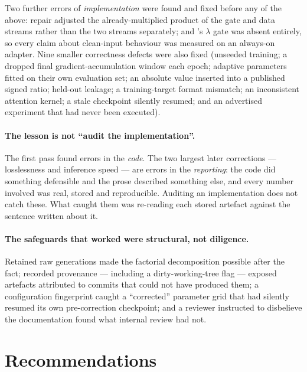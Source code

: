 Two further errors of \emph{implementation} were found and fixed before any of
the above: \gp{} repair adjusted the already-multiplied product of the gate and
data streams rather than the two streams separately; and \gc{}'s $\lambda$ gate
was absent entirely, so every claim about clean-input behaviour was measured on
an always-on adapter. Nine smaller correctness defects were also fixed (unseeded
training; a dropped final gradient-accumulation window each epoch; adaptive
parameters fitted on their own evaluation set; an absolute value inserted into a
published signed ratio; held-out leakage; a training-target format mismatch; an
inconsistent attention kernel; a stale checkpoint silently resumed; and an
advertised experiment that had never been executed).

\paragraph{The lesson is not ``audit the implementation''.} The first pass found
errors in the \emph{code}. The two largest later corrections --- losslessness and
inference speed --- are errors in the \emph{reporting}: the code did something
defensible and the prose described something else, and every number involved was
real, stored and reproducible. Auditing an implementation does not catch these.
What caught them was re-reading each stored artefact against the sentence written
about it.

\paragraph{The safeguards that worked were structural, not diligence.} Retained
raw generations made the factorial decomposition possible after the fact;
recorded provenance --- including a dirty-working-tree flag --- exposed artefacts
attributed to commits that could not have produced them; a configuration
fingerprint caught a ``corrected'' parameter grid that had silently resumed its
own pre-correction checkpoint; and a reviewer instructed to disbelieve the
documentation found what internal review had not.

\section{Recommendations}

